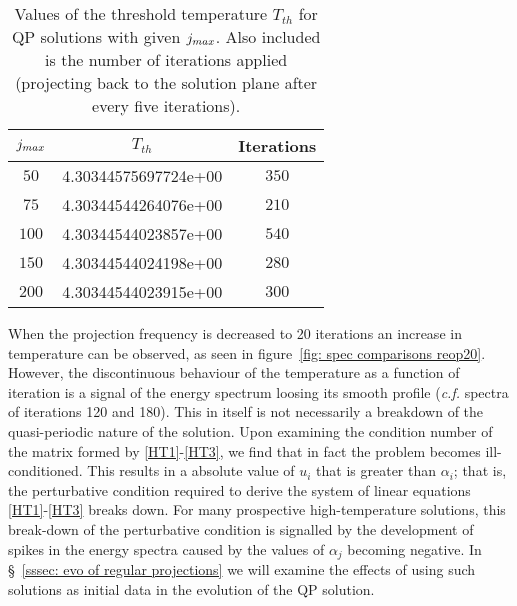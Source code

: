 \documentclass[../PhD.tex]{subfiles}
\begin{document}
\begin{table}
	\centering
	\begin{tabular}[t]{|c|c|c|}
		\hline
		$j_{max}$ & $T_{th}$ & Iterations \\ \hline
		$50$ & 4.30344575697724e+00 & $350$ \\ \hline
		$75$ & 4.30344544264076e+00 & $210$ \\ \hline
		$100$ & 4.30344544023857e+00 & $540$ \\ \hline
		$150$ & 4.30344544024198e+00 & $280$ \\ \hline
		$200$ & 4.30344544023915e+00 & $300$ \\ \hline
	\end{tabular}
	\caption[Threshold temperatures for different series truncations with constant projection frequency]{Values of the threshold temperature $T_{th}$ for QP solutions with given $j_{max}$. Also included is the number of iterations applied (projecting back to the solution plane after every five iterations).}
	\label{tab: T_thresh}
\end{table}

When the projection frequency is decreased to 20 iterations an increase in temperature can be observed, as seen in figure~\ref{fig: spec comparisons reop20}. However, the discontinuous behaviour of the temperature as a function of iteration is a signal of the energy spectrum loosing its smooth profile ({\it c.f.} spectra of iterations 120 and 180). This in itself is not necessarily a breakdown of the quasi-periodic nature of the solution. Upon examining the condition number of the matrix formed by \eqref{HT1}-\eqref{HT3}, we find that in fact the problem becomes ill-conditioned. This results in a absolute value of $u_i$ that is greater than $\alpha_i$; that is, the perturbative condition required to derive the system of linear equations \eqref{HT1}-\eqref{HT3} breaks down. For many prospective high-temperature solutions, this break-down of the perturbative condition is signalled by the development of spikes in the energy spectra caused by the values of $\alpha_j$ becoming negative. In \S~\ref{sssec: evo of regular projections} we will examine the effects of using such solutions as initial data in the evolution of the QP solution.
\end{document}
